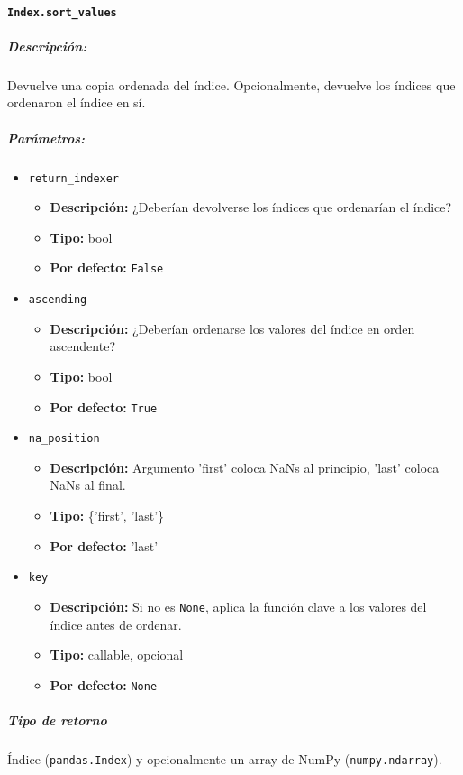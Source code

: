 \paragraph{\texttt{Index.sort\_values}}
\subparagraph{Descripción:}
Devuelve una copia ordenada del índice. Opcionalmente, devuelve los índices que ordenaron el índice en sí.
\subparagraph{Parámetros:}
\begin{itemize}
\item \texttt{return\_indexer}
\begin{itemize}
\item \textbf{Descripción:} ¿Deberían devolverse los índices que ordenarían el índice?
\item \textbf{Tipo:} bool
\item \textbf{Por defecto:} \texttt{False}
\end{itemize}
\item \texttt{ascending}
\begin{itemize}
\item \textbf{Descripción:} ¿Deberían ordenarse los valores del índice en orden ascendente?
\item \textbf{Tipo:} bool
\item \textbf{Por defecto:} \texttt{True}
\end{itemize}
\item \texttt{na\_position}
\begin{itemize}
\item \textbf{Descripción:} Argumento 'first' coloca NaNs al principio, 'last' coloca NaNs al final.
\item \textbf{Tipo:} \{'first', 'last'\}
\item \textbf{Por defecto:} 'last'
\end{itemize}
\item \texttt{key}
\begin{itemize}
\item \textbf{Descripción:} Si no es \texttt{None}, aplica la función clave a los valores del índice antes de ordenar.
\item \textbf{Tipo:} callable, opcional
\item \textbf{Por defecto:} \texttt{None}
\end{itemize}
\end{itemize}
\subparagraph{Tipo de retorno}
Índice (\texttt{pandas.Index}) y opcionalmente un array de NumPy (\texttt{numpy.ndarray}).
